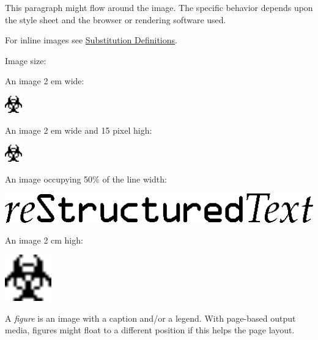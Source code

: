 \documentclass[a4paper]{article}
\begin{document}
This paragraph might flow around the image.
The specific behavior depends upon the style sheet and
the browser or rendering software used.

For inline images see \hyperref[substitution-definitions]{Substitution Definitions}.

Image size:

An image 2 em wide:

\includegraphics[width=2em]{../../../docs/user/rst/images/biohazard.png}

An image 2 em wide and 15 pixel high:

\includegraphics[height=15\pdfpxdimen,width=2em]{../../../docs/user/rst/images/biohazard.png}

An image occupying 50\% of the line width:

\includegraphics[width=0.500\linewidth]{../../../docs/user/rst/images/title.png}

An image 2 cm high:

\includegraphics[height=2cm]{../../../docs/user/rst/images/biohazard.png}

A \emph{figure} is an image with a caption and/or a legend.  With page-based output
media, figures might float to a different position if this helps the page
layout.
\end{document}
